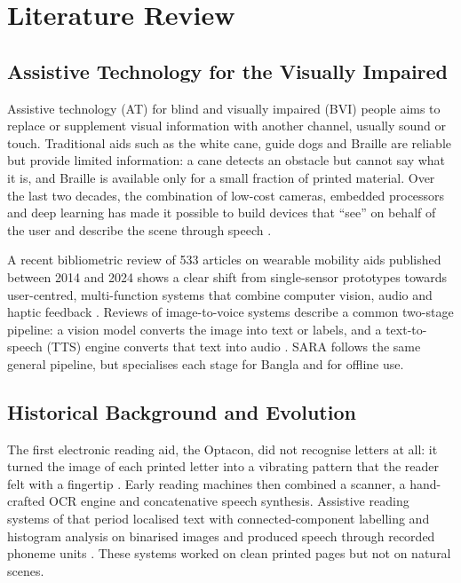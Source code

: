 \clearpage
\chapter{Literature Review}
\label{chap:literature}

\section{Assistive Technology for the Visually Impaired}
\label{sec:assistive}

Assistive technology (AT) for blind and visually impaired (BVI) people aims to replace or supplement visual information with another channel, usually sound or touch. Traditional aids such as the white cane, guide dogs and Braille are reliable but provide limited information: a cane detects an obstacle but cannot say what it is, and Braille is available only for a small fraction of printed material. Over the last two decades, the combination of low-cost cameras, embedded processors and deep learning has made it possible to build devices that ``see'' on behalf of the user and describe the scene through speech \cite{at_review2025, wearable_review2024}.

A recent bibliometric review of 533 articles on wearable mobility aids published between 2014 and 2024 shows a clear shift from single-sensor prototypes towards user-centred, multi-function systems that combine computer vision, audio and haptic feedback \cite{wearable_review2024}. Reviews of image-to-voice systems describe a common two-stage pipeline: a vision model converts the image into text or labels, and a text-to-speech (TTS) engine converts that text into audio \cite{imgspeech_review2024}. SARA follows the same general pipeline, but specialises each stage for Bangla and for offline use.

\section{Historical Background and Evolution}
\label{sec:history}

The first electronic reading aid, the Optacon, did not recognise letters at all: it turned the image of each printed letter into a vibrating pattern that the reader felt with a fingertip \cite{linvill1966}. Early reading machines then combined a scanner, a hand-crafted OCR engine and concatenative speech synthesis. Assistive reading systems of that period localised text with connected-component labelling and histogram analysis on binarised images and produced speech through recorded phoneme units \cite{assistreading2014, speechiface2013}. These systems worked on clean printed pages but not on natural scenes.

